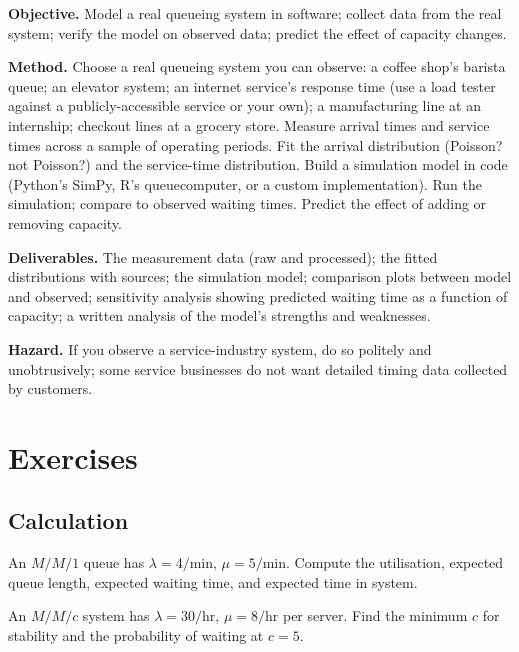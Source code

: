 \begin{project}
\textbf{Objective.} Model a real queueing system in software; collect data from the real system; verify the model on observed data; predict the effect of capacity changes.

\textbf{Method.} Choose a real queueing system you can observe: a coffee shop's barista queue; an elevator system; an internet service's response time (use a load tester against a publicly-accessible service or your own); a manufacturing line at an internship; checkout lines at a grocery store. Measure arrival times and service times across a sample of operating periods. Fit the arrival distribution (Poisson? not Poisson?) and the service-time distribution. Build a simulation model in code (Python's SimPy, R's queuecomputer, or a custom implementation). Run the simulation; compare to observed waiting times. Predict the effect of adding or removing capacity.

\textbf{Deliverables.} The measurement data (raw and processed); the fitted distributions with sources; the simulation model; comparison plots between model and observed; sensitivity analysis showing predicted waiting time as a function of capacity; a written analysis of the model's strengths and weaknesses.

\textbf{Hazard.} If you observe a service-industry system, do so politely and unobtrusively; some service businesses do not want detailed timing data collected by customers.
\end{project}

\section{Exercises}

\subsection*{Calculation}

\begin{exercise}
An $M/M/1$ queue has $\lambda = 4/\text{min}$, $\mu = 5/\text{min}$. Compute the utilisation, expected queue length, expected waiting time, and expected time in system.
\end{exercise}

\begin{exercise}
An $M/M/c$ system has $\lambda = 30/\text{hr}$, $\mu = 8/\text{hr}$ per server. Find the minimum $c$ for stability and the probability of waiting at $c = 5$.
\end{exercise}

